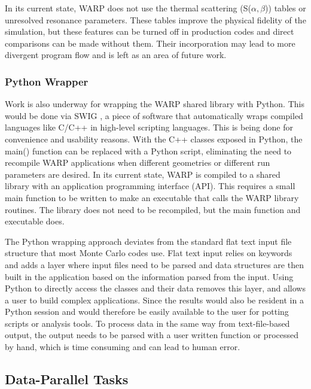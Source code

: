 In its current state, WARP does not use the thermal scattering (S($\alpha,$$\beta$)) tables or unresolved resonance parameters.   These tables improve the physical fidelity of the simulation, but these features can be turned off in production codes and direct comparisons can be made without them.  Their incorporation may lead to more divergent program flow and is left as an area of future work.

\subsubsection{Python Wrapper}

Work is also underway for wrapping the WARP shared library with Python.  This would be done via SWIG \cite{swig}, a piece of software that automatically wraps compiled languages like C/C++ in high-level scripting languages.  This is being done for convenience and usability reasons.  With the C++ classes exposed in Python, the main() function can be replaced with a Python script, eliminating the need to recompile WARP applications when different geometries or different run parameters are desired.  In its current state, WARP is compiled to a shared library with an application programming interface (API).  This requires a small main function to be written to make an executable that calls the WARP library routines.  The library does not need to be recompiled, but the main function and executable does.   %

The Python wrapping approach deviates from the standard flat text input file structure that most Monte Carlo codes use.  Flat text input relies on keywords and adds a layer where input files need to be parsed and data structures are then built in the application based on the information parsed from the input.  Using Python to directly access the classes and their data removes this layer, and allows a user to build complex applications.  Since the results would also be resident in a Python session and would therefore be easily available to the user for potting scripts or analysis tools.  To process data in the same way from text-file-based output, the output needs to be parsed with a user written function or processed by hand, which is time consuming and can lead to human error.


\subsection{Data-Parallel Tasks}
\label{sec:tasks}

